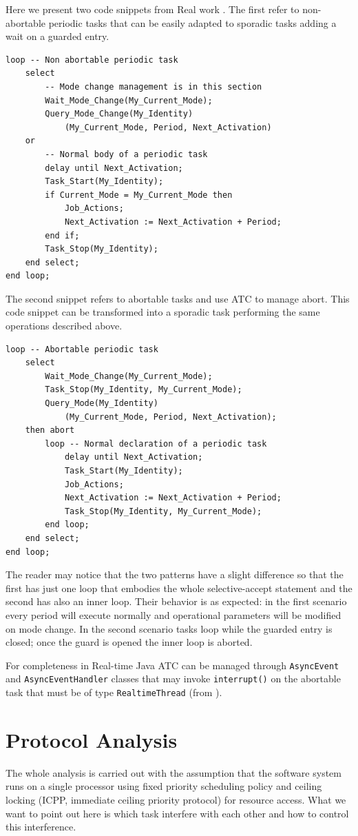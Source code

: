 \documentclass[10pt,a4paper]{report}
\begin{document}
Here we present two code snippets from Real work \cite{real99}. The first refer
to non-abortable periodic tasks that can be easily adapted to sporadic tasks
adding a wait on a guarded entry. 
\begin{lstlisting}[frame=tb]
loop -- Non abortable periodic task
    select
        -- Mode change management is in this section
        Wait_Mode_Change(My_Current_Mode);
        Query_Mode_Change(My_Identity)
            (My_Current_Mode, Period, Next_Activation)
    or 
        -- Normal body of a periodic task
        delay until Next_Activation;
        Task_Start(My_Identity);
        if Current_Mode = My_Current_Mode then
            Job_Actions;
            Next_Activation := Next_Activation + Period;
        end if;
        Task_Stop(My_Identity);
    end select;
end loop;
\end{lstlisting}
The second snippet refers to abortable tasks and use ATC to manage abort. This 
code snippet can be transformed into a sporadic task performing the same 
operations described above. 
\begin{lstlisting}[frame=tb]
loop -- Abortable periodic task
    select
        Wait_Mode_Change(My_Current_Mode);
        Task_Stop(My_Identity, My_Current_Mode);
        Query_Mode(My_Identity)
            (My_Current_Mode, Period, Next_Activation);
    then abort
        loop -- Normal declaration of a periodic task
            delay until Next_Activation;
            Task_Start(My_Identity);
            Job_Actions;
            Next_Activation := Next_Activation + Period;
            Task_Stop(My_Identity, My_Current_Mode);
        end loop;
    end select;
end loop;
\end{lstlisting}
The reader may notice that the two patterns have a slight difference so that 
the first has just one loop that embodies the whole selective-accept statement 
and the second has also an inner loop. Their behavior is as expected: in the 
first scenario every period will execute normally and operational parameters 
will be modified on mode change. In the second scenario tasks loop while the 
guarded entry is closed; once the guard is opened the inner loop is aborted.

For completeness in Real-time Java ATC can be managed through 
\texttt{AsyncEvent} and \texttt{AsyncEventHandler} 
classes that may invoke \texttt{interrupt()} on the abortable task that must be 
of type \texttt{RealtimeThread} (from \cite{brosgol02}). 

\section{Protocol Analysis}
The whole analysis is carried out with the assumption that the software system
runs on a single processor using fixed priority scheduling policy and ceiling 
locking (ICPP, immediate ceiling priority protocol) for resource access. 
What we want to point out here is which task interfere with each other 
and how to control this interference.
\end{document}
